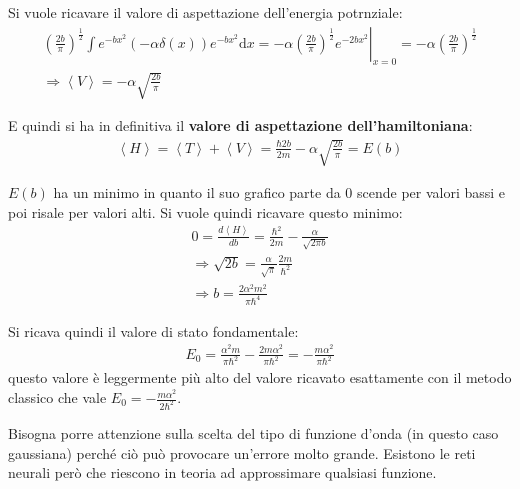 Si vuole ricavare il valore di aspettazione dell'energia potrnziale:
\begin{equation}\begin{split}
\left(\frac{2b}{\pi}\right)^{\frac{1}{2}}\int{e^{-bx^2}\left(-\alpha\delta\left(x\right)\right)e^{-bx^2}\textrm{d}x}=\left.-\alpha\left(\frac{2b}{\pi}\right)^{\frac{1}{2}}e^{-2bx^2}\right|_{x=0}=-\alpha \left(\frac{2b}{\pi}\right)^{\frac{1}{2}}\\
\Longrightarrow \left\langle V \right\rangle=-\alpha\sqrt{\frac{2b}{\pi}}
\end{split}\end{equation}

E quindi si ha in definitiva il \textbf{valore di aspettazione dell'hamiltoniana}:
\begin{equation}\begin{split}
\left\langle H \right\rangle=\left\langle T \right\rangle+\left\langle V \right\rangle=\frac{\hbar 2b}{2m}-\alpha\sqrt{\frac{2b}{\pi}}=E\left(b\right)
\end{split}\end{equation}


$E\left(b\right)$ ha un minimo in quanto il suo grafico parte da $0$ scende per valori bassi e poi risale per valori alti. Si vuole quindi ricavare questo minimo:
\begin{equation}\begin{split}
0=\frac{d\left\langle H \right\rangle}{db}=\frac{\hbar ^2}{2m}-\frac{\alpha}{\sqrt{2\pi b}}\\
\Longrightarrow \sqrt{2b}=\frac{\alpha}{\sqrt{\pi}}\frac{2m}{\hbar ^2}\\
\Longrightarrow b=\frac{2\alpha^2m^2}{\pi\hbar ^4}
\end{split}\end{equation}

Si ricava quindi il valore di stato fondamentale:
\begin{equation}\begin{split}
E_0=\frac{\alpha^2m}{\pi\hbar ^2}-\frac{2m\alpha^2}{\pi\hbar ^2}=-\frac{m\alpha^2}{\pi\hbar ^2}
\end{split}\end{equation}
questo valore è leggermente più alto del valore ricavato esattamente con il metodo classico che vale $E_0=-\frac{m\alpha^2}{2\hbar ^2}$.

Bisogna porre attenzione sulla scelta del tipo di funzione d'onda (in questo caso gaussiana) perché ciò può provocare un'errore molto grande. Esistono le reti neurali però che riescono in teoria ad approssimare qualsiasi funzione.